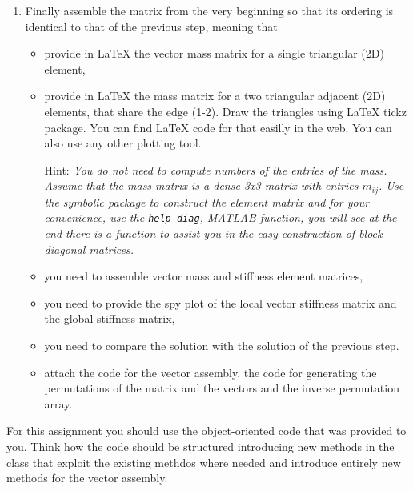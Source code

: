 \documentclass[unicode,11pt,a4paper,oneside,numbers=endperiod,openany]{scrartcl}
\begin{document}
\begin{enumerate}
\item Finally assemble the matrix from the very beginning so that its ordering
is identical to that of the previous step, meaning that
\begin{itemize}
\item provide in LaTeX the vector mass matrix for a single triangular (2D) element,
\item provide in LaTeX the mass matrix for a two triangular adjacent (2D) elements, 
    that share the edge (1-2). Draw the triangles using LaTeX tickz package. You can
    find LaTeX code for that easilly in the web. You can also use any other plotting tool.
\item[Hint:] {\it You do not need to compute numbers of the entries of the mass. Assume
that the mass matrix is a dense 3x3 matrix with entries $m_{ij}$. Use the symbolic
package to construct the element matrix and for your convenience, use the \lstinline+help diag+,
MATLAB function, you will see at the end there is a function to assist you in the easy
construction of block diagonal matrices.}
\item you need to assemble vector mass and stiffness element matrices, 
\item you need to provide the spy plot of the local vector stiffness matrix and the global stiffness matrix,
\item you need to compare the solution with the solution of the previous step. 
\item attach the code for the vector assembly, the code for generating the permutations 
of the matrix and the vectors and the inverse permutation array. 
\end{itemize}

\end{enumerate}
For this assignment you should use the object-oriented code that was provided to you. Think how the code should be structured introducing new methods in the class that exploit the existing methdos where needed and introduce entirely new methods for the vector assembly. 
\end{document}
